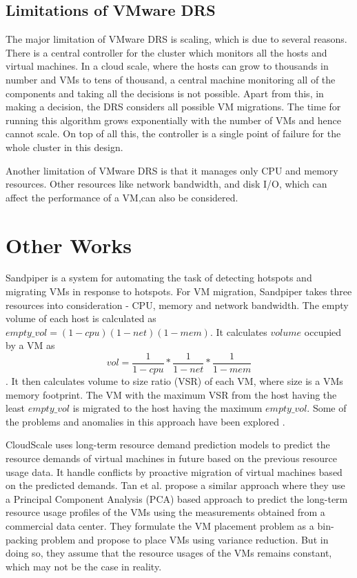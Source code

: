 \subsection{Limitations of VMware DRS}
The major limitation of VMware DRS is scaling, which is due to several reasons. There is a central controller for the cluster which monitors all the hosts and virtual machines. In a cloud scale, where the hosts can grow to thousands in number and VMs to tens of thousand, a central machine monitoring all of the components and taking all the decisions is not possible. Apart from this, in making a decision, the DRS considers all possible VM migrations. The time for running this algorithm grows exponentially with the number of VMs and hence cannot scale. On top of all this, the controller is a single point of failure for the whole cluster in this design.

Another limitation of VMware DRS is that it manages only CPU and memory resources. Other resources like network bandwidth, and disk I/O, which can affect the performance of a VM,can also be considered.

\section{Other Works}
Sandpiper \cite{wood2009sandpiper} is a system for automating the task of detecting hotspots and migrating VMs in response to hotspots. For VM migration, Sandpiper takes three resources into consideration - CPU, memory and network bandwidth. The empty volume of each host is calculated as $empty\_vol = (1-cpu)(1-net)(1-mem)$. It calculates $volume$ occupied by a VM as $$vol = \frac{1}{1-cpu} * \frac{1}{1-net} * \frac{1}{1-mem}$$. It then calculates volume to size ratio (VSR) of each VM, where size is a VMs memory footprint. The VM with the maximum VSR from the host having the least $empty\_vol$ is migrated to the host having the maximum $empty\_vol$. Some of the problems and anomalies in this approach have been explored \cite{mishra2011theory}.

CloudScale \cite{shen2011cloudscale} uses long-term resource demand prediction models to predict the resource demands of virtual machines in future based on the previous resource usage data. It handle conflicts by proactive migration of virtual machines based on the predicted demands. Tan et al. \cite{tan2011exploiting} propose a similar approach where they use a Principal Component Analysis (PCA) based approach to predict the long-term resource usage profiles of the VMs using the measurements obtained from a commercial data center. They formulate the VM placement problem as a bin-packing problem and propose to place VMs using variance reduction. But in doing so, they assume that the resource usages of the VMs remains constant, which may not be the case in reality.

